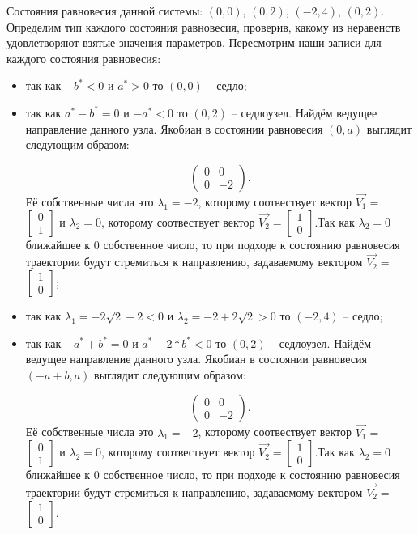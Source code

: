 Состояния равновесия данной системы: $(0, 0)$, $(0, 2)$, $(-2, 4)$, $(0, 2)$. Определим тип каждого состояния равновесия, проверив, какому из неравенств удовлетворяют взятые значения параметров.  Пересмотрим наши записи для каждого состояния равновесия: 
\begin{itemize}
	\item{ так как $-b^\ast  < 0 $ и $a^\ast > 0 $ то $(0, 0)$ -- седло;}
	\item{ так как $a^\ast - b^\ast = 0 $ и $-a^\ast  < 0 $ то $(0, 2)$ -- седлоузел. Найдём ведущее направление данного узла. Якобиан в состоянии равновесия $(0, a)$ выглядит следующим образом:
		
		$$\begin{pmatrix}0 & 0\\0 & -2\end{pmatrix}. $$Её собственные числа это $\lambda_1=-2$, которому соотвествует вектор $\Vec{V_1}=$ $\left[\begin{matrix}0\\1\end{matrix}\right]$ и $\lambda_2=0$, которому соотвествует вектор $\Vec{V_2}=$$\left[\begin{matrix}1\\0\end{matrix}\right]$.Так как $\lambda_2=0$ ближайшее к $0$ собственное число, то при подходе к состоянию равновесия траектории будут стремиться к направлению, задаваемому вектором $\Vec{V_2}=$ $\left[\begin{matrix}1\\0\end{matrix}\right]$;}
	\item{ так как ${\lambda_{1}} = - 2 \sqrt{2} - 2$$  < 0 $ и ${\lambda_{2}} = -2 + 2 \sqrt{2}$$ > 0 $ то $(-2, 4)$ -- седло;}
	\item{ так как $-a^\ast + b^\ast = 0 $ и $a^\ast - 2*b^\ast  < 0 $ то $(0, 2)$ -- седлоузел. Найдём ведущее направление данного узла. Якобиан в состоянии равновесия $(-a + b, a)$ выглядит следующим образом:
		
		$$\begin{pmatrix}0 & 0\\0 & -2\end{pmatrix}. $$Её собственные числа это $\lambda_1=-2$, которому соотвествует вектор $\Vec{V_1}=$ $\left[\begin{matrix}0\\1\end{matrix}\right]$ и $\lambda_2=0$, которому соотвествует вектор $\Vec{V_2}=$$\left[\begin{matrix}1\\0\end{matrix}\right]$.Так как $\lambda_2=0$ ближайшее к $0$ собственное число, то при подходе к состоянию равновесия траектории будут стремиться к направлению, задаваемому вектором $\Vec{V_2}=$ $\left[\begin{matrix}1\\0\end{matrix}\right]$.}
\end{itemize} 

